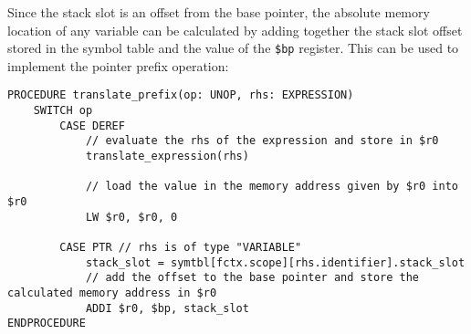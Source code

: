 Since the stack slot is an offset from the base pointer, the absolute memory location of any variable can be calculated by adding together the stack slot offset stored in the symbol table and the value of the \texttt{\$bp} register. This can be used to implement the pointer prefix operation:

\begin{lstlisting}
PROCEDURE translate_prefix(op: UNOP, rhs: EXPRESSION) 
    SWITCH op 
        CASE DEREF 
            // evaluate the rhs of the expression and store in $r0
            translate_expression(rhs)

            // load the value in the memory address given by $r0 into $r0
            LW $r0, $r0, 0

        CASE PTR // rhs is of type "VARIABLE"
            stack_slot = symtbl[fctx.scope][rhs.identifier].stack_slot
            // add the offset to the base pointer and store the calculated memory address in $r0
            ADDI $r0, $bp, stack_slot
ENDPROCEDURE
\end{lstlisting}